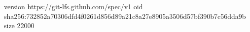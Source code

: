 version https://git-lfs.github.com/spec/v1
oid sha256:732852a70306dfd4f0261d856d89a21c8a27e8905a3506d57bf390b7c56dda9b
size 22000
